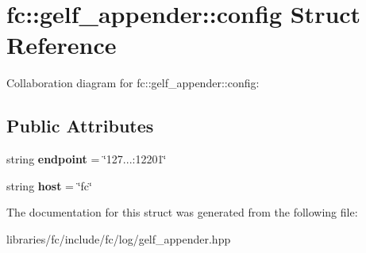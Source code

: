 \hypertarget{structfc_1_1gelf__appender_1_1config}{}\section{fc\+:\+:gelf\+\_\+appender\+:\+:config Struct Reference}
\label{structfc_1_1gelf__appender_1_1config}


Collaboration diagram for fc\+:\+:gelf\+\_\+appender\+:\+:config\+:
\subsection*{Public Attributes}
\begin{DoxyCompactItemize}
\item 
\mbox{\label{structfc_1_1gelf__appender_1_1config_a05092e63c79b6a42d6afe28be8f8b494}} 
string {\bfseries endpoint} = \char`\"{}127...\+:12201\char`\"{}
\item 
\mbox{\label{structfc_1_1gelf__appender_1_1config_a74fb5bd5d3e044746fe5840a711722bd}} 
string {\bfseries host} = \char`\"{}fc\char`\"{}
\end{DoxyCompactItemize}


The documentation for this struct was generated from the following file\+:\begin{DoxyCompactItemize}
\item 
libraries/fc/include/fc/log/gelf\+\_\+appender.\+hpp\end{DoxyCompactItemize}
